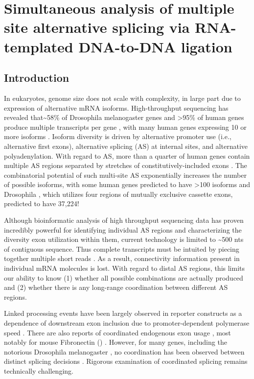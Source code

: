 \chapter{Simultaneous analysis of multiple site alternative splicing via RNA-templated DNA-to-DNA ligation} 
\label{SeqZipPaper} 
\section{Introduction}
	\label{SeqZipPaper:sec:Introduction}

	In eukaryotes, genome size does not scale with complexity, in large part due to expression of alternative mRNA isoforms. High-throughput sequencing has revealed that\textasciitilde58\% of Drosophila melanogaster genes and >95\% of human genes produce multiple transcripts per gene \citep{Wang2008,Pan2008,Brown2014}, with many human genes expressing 10 or more isoforms \citep{Djebali2012}. Isoform diversity is driven by alternative promoter use (i.e., alternative first exons), alternative splicing (AS) at internal sites, and alternative polyadenylation. With regard to AS, more than a quarter of human genes contain multiple AS regions separated by stretches of constitutively-included exons \citep{Fededa2005}. The combinatorial potential of such multi-site AS exponentially increases the number of possible isoforms, with some human genes predicted to have >100 isoforms and Drosophila \dscam{}, which utilizes four regions of mutually exclusive cassette exons, predicted to have 37,224!

	Although bioinformatic analysis of high throughput sequencing data has proven incredibly powerful for identifying individual AS regions and characterizing the diversity exon utilization within them, current technology is limited to \textasciitilde 500 nts of contiguous sequence. Thus complete transcripts must be intuited by piecing together multiple short reads \citep{Boley2014,Haas2013c,Grabherr2011,Garber2011a}. As a result, connectivity information present in individual mRNA molecules is lost. With regard to distal AS regions, this limits our ability to know (1) whether all possible combinations are actually produced and (2) whether there is any long-range coordination between different AS regions.

	Linked processing events have been largely observed in reporter constructs as a dependence of downstream exon inclusion due to promoter-dependent polymerase speed \citep{Kornblihtt2013}. There are also reports of coordinated endogenous exon usage \citep{Fagnani2007}, most notably for mouse Fibronectin (\fn{}) \citep{Fededa2005}. However, for many genes, including the notorious Drosophila melanogaster \dscam{}, no coordination has been observed between distinct splicing decisions \citep{Miura2013b,Sun2013}. Rigorous examination of coordinated splicing remains technically challenging.


